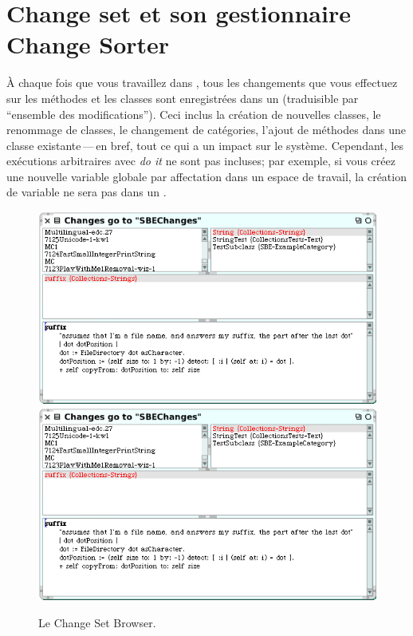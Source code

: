\documentclass[a4paper,10pt,twoside]{book}
\begin{document}
\section{Change set et son gestionnaire Change Sorter}
\label{sec:env:changeSet} %

\`A chaque fois que vous travaillez dans \sq, tous les changements que vous effectuez
sur les m\'ethodes et les classes sont enregistr\'ees dans un
 (traduisible par ``ensemble des modifications'').
Ceci inclus la cr\'eation de nouvelles classes, le renommage de classes, le changement de
cat\'egories, l'ajout de m\'ethodes dans une classe existante\,---\,en bref, tout ce qui a un impact sur le syst\`eme.
Cependant, les ex\'ecutions arbitraires avec \emph{do it} ne sont pas
incluses; par exemple, si vous cr\'eez une nouvelle variable globale par affectation dans 
un espace de travail, la cr\'eation de variable ne sera pas dans un 
.

\begin{figure}[btp]
	\begin{center}
	\ifluluelse
		{\includegraphics [width=\textwidth]{changeSetBrowser}}
		{\includegraphics[scale=0.7]{changeSetBrowser}}
	\end{center}
	\caption{Le Change Set Browser.}
	\label{fig:changeSetBrowser}
\end{figure}
\end{document}
